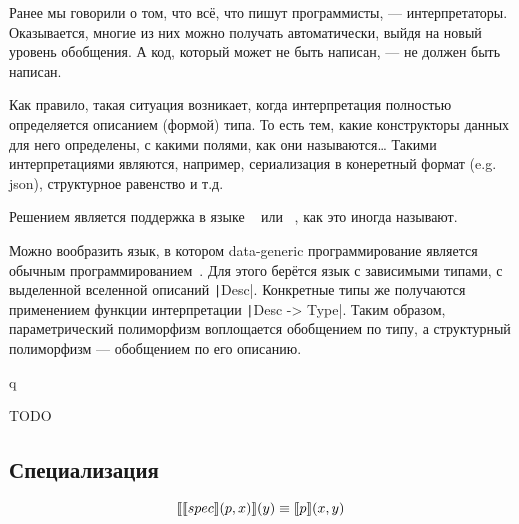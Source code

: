 
Ранее мы говорили о том, что всё, что пишут программисты, --- интерпретаторы.
Оказывается, многие из них можно получать автоматически, выйдя на новый уровень обобщения.
А код, который может не быть написан, --- не должен быть написан.

Как правило, такая ситуация возникает, когда интерпретация полностью определяется описанием (формой) типа.
То есть тем, какие конструкторы данных для него определены, с какими полями, как они называются\ldots
Такими интерпретациями являются, например, сериализация в конеретный формат (e.g. json), структурное равенство и т.д.

Решением является поддержка в языке  ~\cite[глава 13]{maguire-types} или ~\cite{backhousedatatype}, как это иногда называют.


Можно вообразить язык, в котором data-generic программирование является обычным программированием~\cite{chapman2010gentle}.
Для этого берётся язык с зависимыми типами, с выделенной вселенной описаний \texttt|Desc|.
Конкретные типы же получаются применением функции интерпретации \texttt|Desc -> Type|.
Таким образом, параметрический полиморфизм воплощается обобщением по типу, а структурный полиморфизм --- обобщением по его описанию.


q\cite{backhousedatatype}



TODO %

\subsection{Специализация}

\[
    \llbracket{\llbracket{spec}\rrbracket(p, x)}\rrbracket(y) \equiv \llbracket{p}\rrbracket(x, y)
\]







